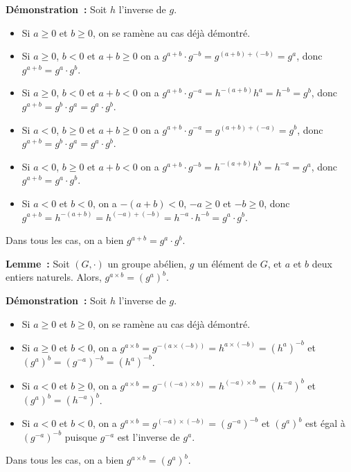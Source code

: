 \noindent\textbf{Démonstration :} Soit $h$ l'inverse de $g$. 
    \begin{itemize}[nosep]
        \item Si $a \geq 0$ et $b \geq 0$, on se ramène au cas déjà démontré.
        \item Si $a \geq 0$, $b < 0$ et $a+b \geq 0$ on a $g^{a+b} \cdot g^{-b} = g^{(a+b) + (-b)}= g^a$, donc $g^{a+b} = g^a \cdot g^b$.
        \item Si $a \geq 0$, $b < 0$ et $a+b < 0$ on a $g^{a+b} \cdot g^{-a} = h^{-(a+b)} h^a = h^{-b} = g^b$, donc $g^{a+b} = g^b \cdot g^a = g^a \cdot g^b$.
        \item Si $a < 0$, $b \geq 0$ et $a+b \geq 0$ on a $g^{a+b} \cdot g^{-a} = g^{(a+b) + (-a)} = g^b$, donc $g^{a+b} = g^b \cdot g^a = g^a \cdot g^b$.
        \item Si $a < 0$, $b \geq 0$ et $a+b < 0$ on a $g^{a+b} \cdot g^{-b} = h^{-(a+b)} h^b = h^{-a} = g^a$, donc $g^{a+b} = g^a \cdot g^b$.
        \item Si $a < 0$ et $b < 0$, on a $-(a+b) < 0$, $-a \geq 0$ et $-b \geq 0$, donc $g^{a+b} = h^{-(a+b)} = h^{(-a) + (-b)} = h^{-a} \cdot h^{-b} = g^a \cdot g^b$.
    \end{itemize}
    Dans tous les cas, on a bien $g^{a+b} = g^a \cdot g^b$.

    \done

\medskip

\noindent\textbf{Lemme :} Soit $(G,\cdot)$ un groupe abélien, $g$ un élément de $G$, et $a$ et $b$ deux entiers naturels. 
    Alors, $g^{a \times b} = (g^a)^b$.

\medskip

\noindent\textbf{Démonstration :} Soit $h$ l'inverse de $g$. 
    \begin{itemize}[nosep]
        \item Si $a \geq 0$ et $b \geq 0$, on se ramène au cas déjà démontré.
        \item Si $a \geq 0$ et $b < 0$, on a $g^{a \times b} = g^{-(a \times (-b))} = h^{a \times (-b)} = (h^a)^{-b}$ et $(g^a)^b = (g^{-a})^{-b} = (h^a)^{-b}$.
        \item Si $a < 0$ et $b \geq 0$, on a $g^{a \times b} = g^{-((-a) \times b)} = h^{(-a) \times b} = (h^{-a})^b$ et $(g^a)^b = (h^{-a})^b$.
        \item Si $a < 0$ et $b < 0$, on a $g^{a \times b} = g^{(-a) \times (-b)} = (g^{-a})^{-b}$ et $(g^a)^b$ est égal à $(g^{-a})^{-b}$ puisque $g^{-a}$ est l'inverse de $g^a$.
    \end{itemize}
    Dans tous les cas, on a bien $g^{a \times b} = (g^a)^b$.

